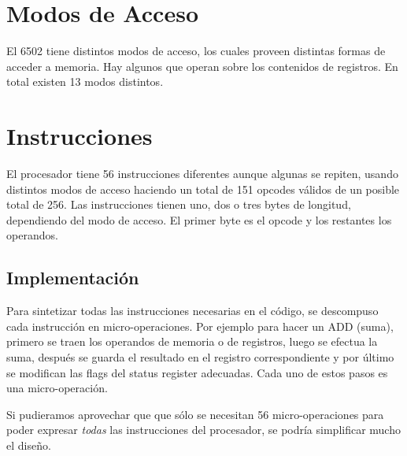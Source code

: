 \section{Modos de Acceso}
El 6502 tiene distintos modos de acceso, los cuales proveen distintas formas de acceder a memoria. Hay algunos que operan sobre los contenidos de registros. En total existen 13 modos distintos.

\section{Instrucciones}

El procesador tiene 56 instrucciones diferentes aunque algunas se repiten, usando distintos modos de acceso haciendo un total de 151 opcodes válidos de un posible total de 256. Las instrucciones tienen uno, dos o tres bytes de longitud, dependiendo del modo de acceso. El primer byte es el opcode y los restantes los operandos.

\subsection{Implementación}

Para sintetizar todas las instrucciones necesarias en el código, se descompuso cada instrucción en micro-operaciones. Por ejemplo para hacer un ADD (suma), primero se traen los operandos de memoria o de registros, luego se efectua la suma, después se guarda el resultado en el registro correspondiente y por último se modifican las flags del status register adecuadas. Cada uno de estos pasos es una micro-operación.

Si pudieramos aprovechar que que sólo se necesitan 56 micro-operaciones para poder expresar \emph{todas} las instrucciones del procesador, se podría simplificar mucho el diseño.

